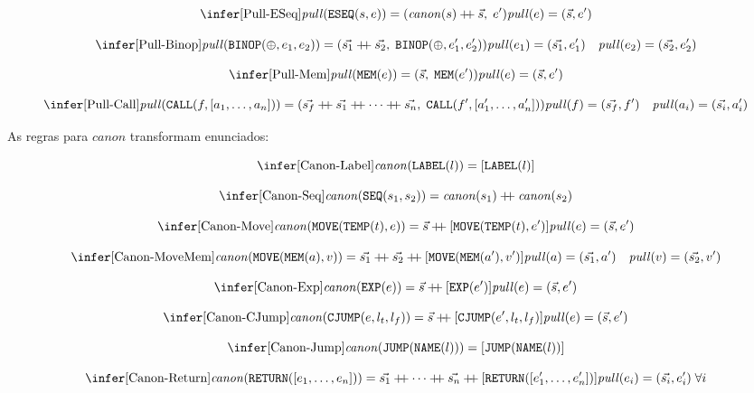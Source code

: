 \[
  \infer[\text{Pull-ESeq}]
  {\mathit{pull}(\texttt{ESEQ}(s, e)) = (\mathit{canon}(s)
  \mathbin{+\!\!+} \vec{s},\; e')}
  {\mathit{pull}(e) = (\vec{s}, e')}
\]

\[
  \infer[\text{Pull-Binop}]
  {\mathit{pull}(\texttt{BINOP}(\oplus, e_1, e_2)) =
  (\vec{s_1} \mathbin{+\!\!+} \vec{s_2},\; \texttt{BINOP}(\oplus, e_1', e_2'))}
  {\mathit{pull}(e_1) = (\vec{s_1}, e_1') \quad \mathit{pull}(e_2) =
  (\vec{s_2}, e_2')}
\]

\[
  \infer[\text{Pull-Mem}]
  {\mathit{pull}(\texttt{MEM}(e)) = (\vec{s},\; \texttt{MEM}(e'))}
  {\mathit{pull}(e) = (\vec{s}, e')}
\]

\[
  \infer[\text{Pull-Call}]
  {\mathit{pull}(\texttt{CALL}(f, [a_1, \ldots, a_n])) =
    (\vec{s_f} \mathbin{+\!\!+} \vec{s_1} \mathbin{+\!\!+} \cdots
      \mathbin{+\!\!+} \vec{s_n},\;
  \texttt{CALL}(f', [a_1', \ldots, a_n']))}
  {\mathit{pull}(f) = (\vec{s_f}, f') \quad \mathit{pull}(a_i) =
  (\vec{s_i}, a_i')}
\]

As regras para $\mathit{canon}$ transformam enunciados:

\[
  \infer[\text{Canon-Label}]{\mathit{canon}(\texttt{LABEL}(l)) =
  [\texttt{LABEL}(l)]}{}
\]

\[
  \infer[\text{Canon-Seq}]{\mathit{canon}(\texttt{SEQ}(s_1, s_2)) =
  \mathit{canon}(s_1) \mathbin{+\!\!+} \mathit{canon}(s_2)}{}
\]

\[
  \infer[\text{Canon-Move}]
  {\mathit{canon}(\texttt{MOVE}(\texttt{TEMP}(t), e)) =
  \vec{s} \mathbin{+\!\!+} [\texttt{MOVE}(\texttt{TEMP}(t), e')]}
  {\mathit{pull}(e) = (\vec{s}, e')}
\]

\[
  \infer[\text{Canon-MoveMem}]
  {\mathit{canon}(\texttt{MOVE}(\texttt{MEM}(a), v)) =
    \vec{s_1} \mathbin{+\!\!+} \vec{s_2} \mathbin{+\!\!+}
  [\texttt{MOVE}(\texttt{MEM}(a'), v')]}
  {\mathit{pull}(a) = (\vec{s_1}, a') \quad \mathit{pull}(v) = (\vec{s_2}, v')}
\]

\[
  \infer[\text{Canon-Exp}]
  {\mathit{canon}(\texttt{EXP}(e)) = \vec{s} \mathbin{+\!\!+}
  [\texttt{EXP}(e')]}
  {\mathit{pull}(e) = (\vec{s}, e')}
\]

\[
  \infer[\text{Canon-CJump}]
  {\mathit{canon}(\texttt{CJUMP}(e, l_t, l_f)) =
  \vec{s} \mathbin{+\!\!+} [\texttt{CJUMP}(e', l_t, l_f)]}
  {\mathit{pull}(e) = (\vec{s}, e')}
\]

\[
  \infer[\text{Canon-Jump}]
  {\mathit{canon}(\texttt{JUMP}(\texttt{NAME}(l))) =
  [\texttt{JUMP}(\texttt{NAME}(l))]}{}
\]

\[
  \infer[\text{Canon-Return}]
  {\mathit{canon}(\texttt{RETURN}([e_1, \ldots, e_n])) =
    \vec{s_1} \mathbin{+\!\!+} \cdots \mathbin{+\!\!+} \vec{s_n}
    \mathbin{+\!\!+}
  [\texttt{RETURN}([e_1', \ldots, e_n'])]}
  {\mathit{pull}(e_i) = (\vec{s_i}, e_i')\; \forall i}
\]

